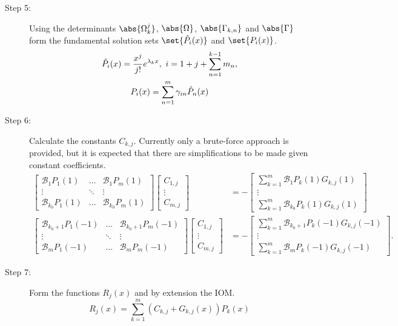 \documentclass{article}
\begin{document}
\begin{description}
\begin{equation*}
\end{equation*}
\item[Step 5:] Using the determinants $\abs{\Omega_k^j}$, $\abs{\Omega}$, $\abs{\Gamma_{k,n}}$ and $\abs{\Gamma}$ form the fundamental solution sets $\set{\hat{P}_i(x)}$ and $\set{P_i(x)}$.
\begin{equation*}
\begin{gathered}
\hat{P}_i(x) = \frac{x^j}{j!} e^{\lambda_k x}, \ i = 1 + j + \sum_{n=1}^{k-1} m_n, \\
P_i(x) = \sum_{n=1}^m \gamma_{in} \hat{P}_n(x)
\end{gathered}
\end{equation*}
\item[Step 6:] Calculate the constants $C_{k,j}$.
Currently only a brute-force approach is provided, but it is expected that there are simplifications to be made given constant coefficients.
\begin{equation*}
\begin{aligned}
\begin{bmatrix} \mathcal{B}_1 P_1(1) & \dots &  \mathcal{B}_1 P_m(1) \\ \vdots & \ddots & \vdots \\  \mathcal{B}_{k_0} P_1(1) & \dots &  \mathcal{B}_{k_0} P_m(1)  \end{bmatrix}
\begin{bmatrix} C_{1,j} \\ \vdots \\ C_{m,j} \end{bmatrix}
& = - \begin{bmatrix} \sum_{k=1}^m \mathcal{B}_1 P_k(1) G_{k,j}(1) \\ \vdots \\ \sum_{k=1}^m \mathcal{B}_{k_0} P_k(1) G_{k,j}(1) \end{bmatrix} \\
\begin{bmatrix} \mathcal{B}_{k_0 + 1} P_1(-1) & \dots &  \mathcal{B}_{k_0+1} P_m(-1) \\ \vdots & \ddots & \vdots \\  \mathcal{B}_m P_1(-1) & \dots &  \mathcal{B}_m P_m(-1)  \end{bmatrix}
\begin{bmatrix} C_{1,j} \\ \vdots \\ C_{m,j} \end{bmatrix}
& = - \begin{bmatrix} \sum_{k=1}^m \mathcal{B}_{k_0+1} P_k(-1) G_{k,j}(-1) \\ \vdots \\ \sum_{k=1}^m \mathcal{B}_m P_k(-1) G_{k,j}(-1) \end{bmatrix} .
\end{aligned}
\end{equation*}
\item[Step 7:] Form the functions $R_j(x)$ and by extension the IOM.
\begin{equation*}
R_j(x) = \sum_{k=1}^m (C_{k,j} + G_{k,j}(x) ) P_k(x)
\end{equation*}
\end{description}
\end{document}
